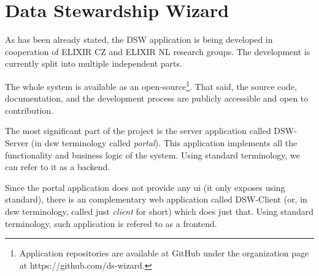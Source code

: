 \section{Data Stewardship Wizard}

As has been already stated, the DSW application is being developed in cooperation of ELIXIR CZ and ELIXIR NL research groups.
The development is currently split into multiple independent parts.

The whole system is available as an open-source\footnote{Application repositories are available at GitHub under the organization page at https://github.com/ds-wizard.}.
That said, the source code, documentation, and the development process are publicly accessible and open to contribution.

The most significant part of the project is the server application called DSW-Server (in \gls{dsw} terminology called \textit{portal}).
This application implements all the functionality and business logic of the system.
Using standard terminology, we can refer to it as a backend.

Since the portal application does not provide any \gls{ui} (it only exposes  using  standard), there is an complementary web application called DSW-Client (or, in \gls{dsw} terminology, called just \textit{client} for short) which does just that.
Using standard terminology, such application is refered to as a frontend.

